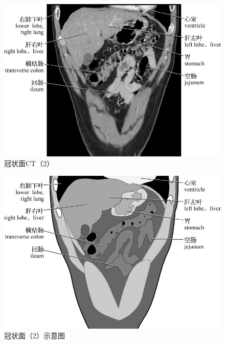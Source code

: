 \begin{figure}[!htbp]
 \centering
 \includegraphics{./images/Image00096.jpg}
 \captionsetup{justification=centering}
 \caption{冠状面CT（2）}
  \end{figure} 
 \FloatBarrier

\begin{figure}[!htbp]
 \centering
 \includegraphics{./images/Image00097.jpg}
 \captionsetup{justification=centering}
 \caption{冠状面（2）示意图}
  \end{figure} 
 \FloatBarrier

